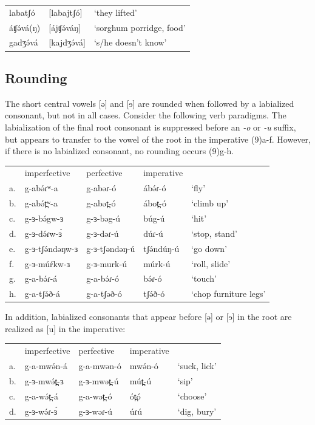 \ea
\begin{tabular}[t]{lll}
labatʃó	&	[labajtʃó]	&	‘they lifted’\\
áʧə́vá(ŋ)	&	[ájʧə́váŋ]	&	‘sorghum porridge, food’\\
gadʒə́vá	&	[kajdʒə́vá]	&	‘s/he doesn’t know’\\
\end{tabular}
\z

\subsection{Rounding}
The short central vowels [ə] and [ɘ] are rounded when followed by a labialized consonant, but not in all cases. Consider the following verb paradigms. The labialization of the final root consonant is suppressed before an \textit{-o} or \textit{-u} suffix, but appears to transfer to the vowel of the root in the imperative (9)a-f. However, if there is no labialized consonant, no rounding occurs (9)g-h.

\ea
\begin{tabular}[t]{lllll}
&	imperfective	&	perfective	&	imperative	&\\
a.	&	g-abə́ɾʷ-a	&	g-abəɾ-ó	&	ábə́ɾ-ó	&	‘fly’\\
b.	&	g-abə́t̪ʷ-a	&	g-abət̪-ó	&	ábot̪-ó	&	‘climb up’\\
c.	&	g-ɜ-bə́gw-ɜ	&	g-ɜ-bəg-ú	&	búg-ú	&	‘hit’\\
d.	&	g-ɜ-də́ɾw-ɜ́	&	g-ɜ-dəɾ-ú	&	dúɾ-ú	&	‘stop, stand’\\
e.	&	g-ɜ-tʃə́ndəŋw-ɜ	&	g-ɜ-tʃəndəŋ-ú	&	tʃə́ndúŋ-ú	&	‘go down’\\
f.	&	g-ɜ-múŕkw-ɜ	&	g-ɜ-murk-ú	&	múrk-ú	&	‘roll, slide’\\
g.	&	g-a-bə́ɾ-á	&	g-a-bə́ɾ-ó	&	bə́ɾ-ó	&	‘touch’\\
h.	&	g-a-tʃə́ð-á	&	g-a-tʃəð-ó	&	tʃə́ð-ó	&	‘chop furniture legs’\\
\end{tabular}
\z
In addition, labialized consonants that appear before [ə] or [ɘ] in the root are realized as [u] in the imperative:

\ea
\begin{tabular}[t]{lllll}
&	imperfective	&	perfective	&	imperative\\
a.	&	g-a-mwə́n-á	&	g-a-mwən-ó	&	mwə́n-ó	&	‘suck, lick’\\
b.	&	g-ɜ-mwə́t̪-ɜ	&	g-ɜ-mwət̪-ú	&	mút̪-ú	&	‘sip’\\
c.	&	g-a-wə́t̪-á	&	g-a-wət̪-ó	&	ót̪ó	&	‘choose’\\
d.	&	g-ɜ-wə́ɾ-ɜ́	&	g-ɜ-wəɾ-ú	&	úɾú	&	‘dig, bury’\\
\end{tabular}
\z

